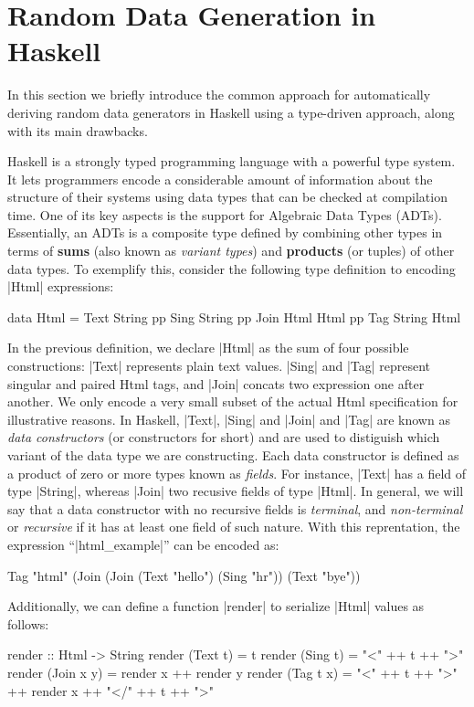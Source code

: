 \section{Random Data Generation in Haskell} \label{sec:randomtesting}

In this section we briefly introduce the common approach for automatically
deriving random data generators in Haskell using a type-driven approach, along
with its main drawbacks.


Haskell is a strongly typed programming language with a powerful type system.
%
It lets programmers encode a considerable amount of information about the
structure of their systems using data types that can be checked at compilation
time.
%
One of its key aspects is the support for Algebraic Data Types (ADTs).
%
Essentially, an ADTs is a composite type defined by combining other types in
terms of \textbf{sums} (also known as \emph{variant types}) and
\textbf{products} (or tuples) of other data types.
%
To exemplify this, consider the following type definition to encoding |Html|
expressions:
%
\begin{code}
data Html  =   Text  String
           pp  Sing  String
           pp  Join  Html    Html
           pp  Tag   String  Html
\end{code}

In the previous definition, we declare |Html| as the sum of four possible
constructions: |Text| represents plain text values. |Sing| and |Tag| represent
singular and paired Html tags, and |Join| concats two expression one after
another.
%
We only encode a very small subset of the actual Html specification for
illustrative reasons.
%
In Haskell, |Text|, |Sing| and |Join| and |Tag| are known as \emph{data
  constructors} (or constructors for short) and are used to distiguish which
variant of the data type we are constructing.
%
Each data constructor is defined as a product of zero or more types known as
\emph{fields}.
%
For instance, |Text| has a field of type |String|, whereas |Join| two recusive
fields of type |Html|.
%
In general, we will say that a data constructor with no recursive fields is
\emph{terminal}, and \emph{non-terminal} or \emph{recursive} if it has at least
one field of such nature.
%
With this reprentation, the expression ``|html_example|'' can be encoded as:
%
\begin{code}
Tag "html" (Join (Join
  (Text "hello") (Sing "hr")) (Text "bye"))
\end{code}
%
Additionally, we can define a function |render| to serialize |Html| values as
follows:
%
\begin{code}
render :: Html -> String
render (Text t) = t
render (Sing t) = "<" ++ t ++ ">"
render (Join x y) = render x ++ render y
render (Tag t x)
  = "<" ++ t ++ ">" ++ render x ++ "</" ++ t ++ ">"
\end{code}

